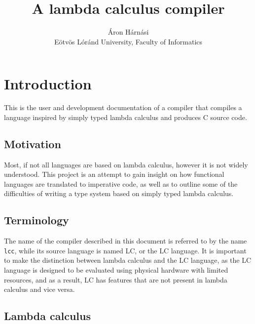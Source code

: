\documentclass[12pt]{article}
\title{A lambda calculus compiler}
\author{Áron Hárnási \\
    \normalsize Eötvös Lóránd University, Faculty of Informatics}
\begin{document}
\linespread{1}
\maketitle
\pagebreak
\tableofcontents
\pagebreak

\section{Introduction}

This is the user and development documentation of a compiler that compiles a
language inspired by simply typed lambda calculus and produces C source code.

\subsection{Motivation}

Most, if not all languages are based on lambda calculus, however it is not
widely understood. This project is an attempt to gain insight on how functional
languages are translated to imperative code, as well as to outline some of the
difficulties of writing a type system based on simply typed lambda calculus.

\subsection{Terminology}

The name of the compiler described in this document is referred to by the name
\verb$lcc$, while its source language is named LC, or the LC language. It is
important to make the distinction between lambda calculus and the LC language,
as the LC language is designed to be evaluated using physical hardware with
limited resources, and as a result, LC has features that are not present in
lambda calculus and vice versa.

\subsection{Lambda calculus}
\end{document}
